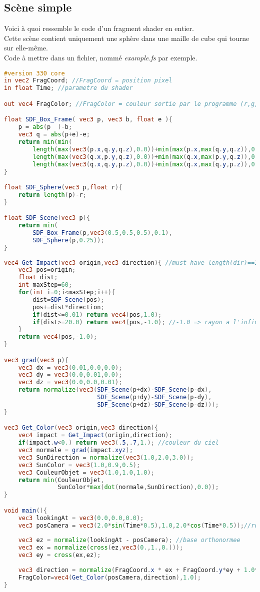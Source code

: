 \subsection{Scène simple}
Voici à quoi ressemble le code d'un fragment shader en entier.\\
Cette scène contient uniquement une sphère dans une maille de cube qui tourne sur elle-même.\\
Code à mettre dans un fichier, nommé \emph{example.fs} par exemple.
\begin{lstlisting}[language=GLSL, title={Example de fragment shader}]
#version 330 core
in vec2 FragCoord; //FragCoord = position pixel
in float Time; //parametre du shader

out vec4 FragColor; //FragColor = couleur sortie par le programme (r,g,b,a)

float SDF_Box_Frame( vec3 p, vec3 b, float e ){
    p = abs(p  )-b;
    vec3 q = abs(p+e)-e;
    return min(min(
        length(max(vec3(p.x,q.y,q.z),0.0))+min(max(p.x,max(q.y,q.z)),0.0),
        length(max(vec3(q.x,p.y,q.z),0.0))+min(max(q.x,max(p.y,q.z)),0.0)),
        length(max(vec3(q.x,q.y,p.z),0.0))+min(max(q.x,max(q.y,p.z)),0.0));
}

float SDF_Sphere(vec3 p,float r){
    return length(p)-r;
}

float SDF_Scene(vec3 p){
    return min(
        SDF_Box_Frame(p,vec3(0.5,0.5,0.5),0.1),
        SDF_Sphere(p,0.25));
}
    
vec4 Get_Impact(vec3 origin,vec3 direction){ //must have length(dir)==1 
    vec3 pos=origin;
    float dist;
    int maxStep=60;
    for(int i=0;i<maxStep;i++){
        dist=SDF_Scene(pos);
        pos+=dist*direction;
        if(dist<=0.01) return vec4(pos,1.0);
        if(dist>=20.0) return vec4(pos,-1.0); //-1.0 => rayon a l'infini
    }
    return vec4(pos,-1.0);
}

vec3 grad(vec3 p){
    vec3 dx = vec3(0.01,0.0,0.0);
    vec3 dy = vec3(0.0,0.01,0.0);
    vec3 dz = vec3(0.0,0.0,0.01);
    return normalize(vec3(SDF_Scene(p+dx)-SDF_Scene(p-dx),
                          SDF_Scene(p+dy)-SDF_Scene(p-dy),
                          SDF_Scene(p+dz)-SDF_Scene(p-dz)));
}

vec3 Get_Color(vec3 origin,vec3 direction){
    vec4 impact = Get_Impact(origin,direction);
    if(impact.w<0.) return vec3(.5,.7,1.); //couleur du ciel
    vec3 normale = grad(impact.xyz);
    vec3 SunDirection = normalize(vec3(1.0,2.0,3.0));
    vec3 SunColor = vec3(1.0,0.9,0.5);
    vec3 CouleurObjet = vec3(1.0,1.0,1.0);
    return min(CouleurObjet,
               SunColor*max(dot(normale,SunDirection),0.0));
}

void main(){
    vec3 lookingAt = vec3(0.0,0.0,0.0);
    vec3 posCamera = vec3(2.0*sin(Time*0.5),1.0,2.0*cos(Time*0.5));//rotating camera
    
    vec3 ez = normalize(lookingAt - posCamera); //base orthonormee
    vec3 ex = normalize(cross(ez,vec3(0.,1.,0.)));
    vec3 ey = cross(ex,ez);
    
    vec3 direction = normalize(FragCoord.x * ex + FragCoord.y*ey + 1.0*ez);
    FragColor=vec4(Get_Color(posCamera,direction),1.0);
}
\end{lstlisting}